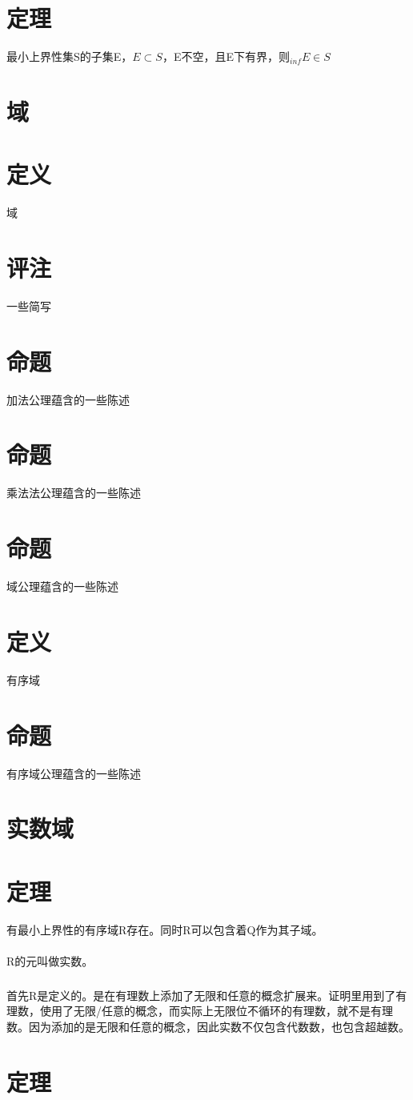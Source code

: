 \section{定理} 最小上界性集S的子集E，$E \subset S$，E不空，且E下有界，则$ _{inf}E \in S$
\section*{域}
\section{定义} 域
\section{评注} 一些简写
\section{命题} 加法公理蕴含的一些陈述
\section{命题} 乘法法公理蕴含的一些陈述
\section{命题} 域公理蕴含的一些陈述
\section{定义} 有序域
\section{命题} 有序域公理蕴含的一些陈述
\section*{实数域}
\section{定理}有最小上界性的有序域R存在。同时R可以包含着Q作为其子域。
\paragraph{}R的元叫做实数。
\subparagraph{}首先R是定义的。是在有理数上添加了无限和任意的概念扩展来。证明里用到了有理数，使用了无限/任意的概念，而实际上无限位不循环的有理数，就不是有理数。因为添加的是无限和任意的概念，因此实数不仅包含代数数，也包含超越数。
\section{定理}
